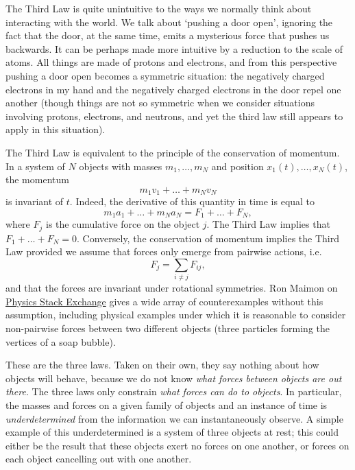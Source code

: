 The Third Law is quite unintuitive to the ways we normally think about interacting with the world. We talk about `pushing a door open', ignoring the fact that the door, at the same time, emits a mysterious force that pushes us backwards. It can be perhaps made more intuitive by a reduction to the scale of atoms. All things are made of protons and electrons, and from this perspective pushing a door open becomes a symmetric situation: the negatively charged electrons in my hand and the negatively charged electrons in the door repel one another (though things are not so symmetric when we consider situations involving protons, electrons, and neutrons, and yet the third law still appears to apply in this situation).

The Third Law is equivalent to the principle of the conservation of momentum. In a system of $N$ objects with masses $m_1, \dots, m_N$ and position $x_1(t), \dots, x_N(t)$, the momentum
%
\[ m_1 v_1 + \dots + m_N v_N \]
%
is invariant of $t$. Indeed, the derivative of this quantity in time is equal to
%
\[ m_1 a_1 + \dots + m_N a_N = F_1 + \dots + F_N, \]
%
where $F_j$ is the cumulative force on the object $j$. The Third Law implies that $F_1 + \dots + F_N = 0$. Conversely, the conservation of momentum implies the Third Law provided we assume that forces only emerge from pairwise actions, i.e.
%
\[ F_j = \sum_{i \neq j} F_{ij}, \]
%
and that the forces are invariant under rotational symmetries. Ron Maimon on \href{https://physics.stackexchange.com/questions/12122/deriving-newtons-third-law-from-homogeneity-of-space}{Physics Stack Exchange} gives a wide array of counterexamples without this assumption, including physical examples under which it is reasonable to consider non-pairwise forces between two different objects (three particles forming the vertices of a soap bubble).

These are the three laws. Taken on their own, they say nothing about how objects will behave, because we do not know \emph{what forces between objects are out there}. The three laws only constrain \emph{what forces can do to objects}. In particular, the masses and forces on a given family of objects and an instance of time is \emph{underdetermined} from the information we can instantaneously observe. A simple example of this underdetermined is a system of three objects at rest; this could either be the result that these objects exert no forces on one another, or forces on each object cancelling out with one another.

